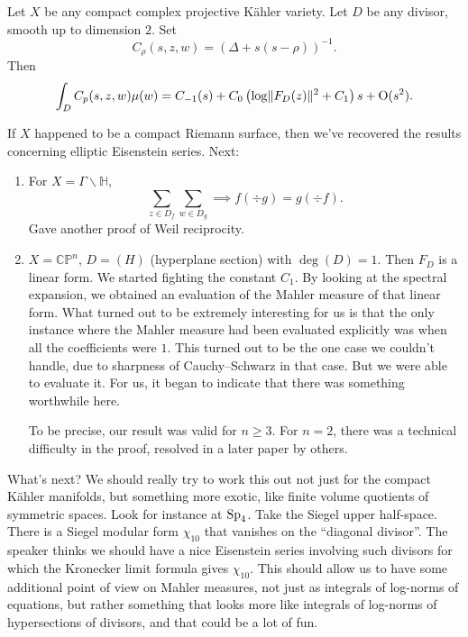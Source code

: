 \documentclass[reqno]{amsart} 
\begin{document}
\begin{theorem}[CJS]
  Let $X$ be any compact complex projective K\"{a}hler variety. Let $D$ be any divisor, smooth up to dimension $2$.  Set
  \begin{equation*}
    C_\rho(s, z, w) =(\Delta + s(s - \rho))^{-1}.
  \end{equation*}
  Then
  \begin{equation*}
    \int_D C_p(s, z, w) \mu(w)
    = C_{- 1}(s) + C_0 \left( \log \lVert F_D(z) \rVert^2 + C_1 \right) s
    + \operatorname{O}(s^2).
  \end{equation*}
\end{theorem}
If $X$ happened to be a compact Riemann surface, then we've recovered the results concerning elliptic Eisenstein series.  Next:
\begin{enumerate}
\item For $X = \Gamma \backslash \mathbb{H}$,
  \begin{equation*}
    \sum_{z \in D_f}
    \sum_{w \in D_g}
    \implies
    f(\div g) = g(\div f).
  \end{equation*}
  Gave another proof of Weil reciprocity.
\item $X = \mathbb{C} \mathbb{P}^n$, $D = (H)$ (hyperplane section) with $\deg(D) = 1$.  Then $F_D$ is a linear form.  We started fighting the constant $C_1$.  By looking at the spectral expansion, we obtained an evaluation of the Mahler measure of that linear form.  What turned out to be extremely interesting for us is that the only instance where the Mahler measure had been evaluated explicitly was when all the coefficients were $1$.  This turned out to be the one case we couldn't handle, due to sharpness of Cauchy--Schwarz in that case.  But we were able to evaluate it.  For us, it began to indicate that there was something worthwhile here.

  To be precise, our result was valid for $n \geq 3$.  For $n = 2$, there was a technical difficulty in the proof, resolved in a later paper by others.
\end{enumerate}
What's next?  We should really try to work this out not just for the compact K\"{a}hler manifolds, but something more exotic, like finite volume quotients of symmetric spaces.  Look for instance at $\operatorname{Sp}_4$.  Take the Siegel upper half-space.  There is a Siegel modular form $\chi_{10}$ that vanishes on the ``diagonal divisor''.  The speaker thinks we should have a nice Eisenstein series involving such divisors for which the Kronecker limit formula gives $\chi_{10}$.  This should allow us to have some additional point of view on Mahler measures, not just as integrals of log-norms of equations, but rather something that looks more like integrals of log-norms of hypersections of divisors, and that could be a lot of fun.
\end{document}
